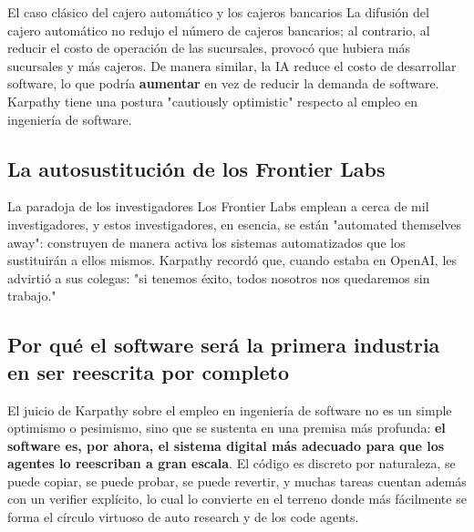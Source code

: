 \documentclass[a4paper]{article}
\begin{document}
\begin{knowledgebox}{El caso clásico del cajero automático y los cajeros bancarios}
La difusión del cajero automático no redujo el número de cajeros bancarios; al contrario, al reducir el costo de operación de las sucursales, provocó que hubiera más sucursales y más cajeros. De manera similar, la IA reduce el costo de desarrollar software, lo que podría \textbf{aumentar} en vez de reducir la demanda de software. Karpathy tiene una postura "cautiously optimistic" respecto al empleo en ingeniería de software.
\end{knowledgebox}

\subsection{La autosustitución de los Frontier Labs}

\begin{warningbox}{La paradoja de los investigadores}
Los Frontier Labs emplean a cerca de mil investigadores, y estos investigadores, en esencia, se están "automated themselves away": construyen de manera activa los sistemas automatizados que los sustituirán a ellos mismos. Karpathy recordó que, cuando estaba en OpenAI, les advirtió a sus colegas: "si tenemos éxito, todos nosotros nos quedaremos sin trabajo."
\end{warningbox}

\subsection{Por qué el software será la primera industria en ser reescrita por completo}
El juicio de Karpathy sobre el empleo en ingeniería de software no es un simple optimismo o pesimismo, sino que se sustenta en una premisa más profunda: \textbf{el software es, por ahora, el sistema digital más adecuado para que los agentes lo reescriban a gran escala}. El código es discreto por naturaleza, se puede copiar, se puede probar, se puede revertir, y muchas tareas cuentan además con un verifier explícito, lo cual lo convierte en el terreno donde más fácilmente se forma el círculo virtuoso de auto research y de los code agents.
\end{document}
